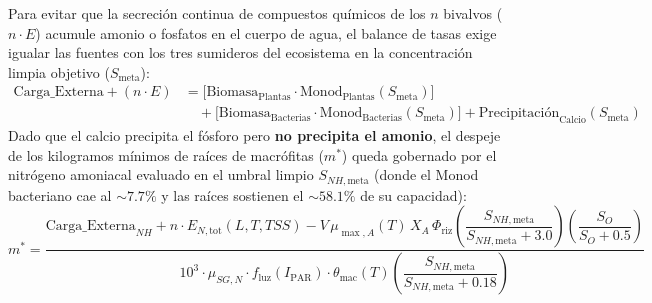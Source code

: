 \documentclass[11pt,letterpaper]{article}
\begin{document}
\begin{resumenbox}
Para evitar que la secreción continua de compuestos químicos de los $n$ bivalvos ($n \cdot E$) acumule amonio o fosfatos en el cuerpo de agua, el balance de tasas exige igualar las fuentes con los tres sumideros del ecosistema en la concentración limpia objetivo ($S_{\text{meta}}$):
\[
\begin{aligned}
    \text{Carga\_Externa} + (n \cdot E) &= \Big[\text{Biomasa}_{\text{Plantas}}\cdot \text{Monod}_{\text{Plantas}}(S_{\text{meta}})\Big] \\
    &\quad + \Big[\text{Biomasa}_{\text{Bacterias}}\cdot \text{Monod}_{\text{Bacterias}}(S_{\text{meta}})\Big] + \text{Precipitación}_{\text{Calcio}}(S_{\text{meta}})
\end{aligned}
\]
Dado que el calcio precipita el fósforo pero \textbf{no precipita el amonio}, el despeje de los kilogramos mínimos de raíces de macrófitas ($m^*$) queda gobernado por el nitrógeno amoniacal evaluado en el umbral limpio $S_{NH,\text{meta}}$ (donde el Monod bacteriano cae al $\sim 7.7\%$ y las raíces sostienen el $\sim 58.1\%$ de su capacidad):
\[
    m^* = \frac{\text{Carga\_Externa}_{NH} + n \cdot E_{N,\text{tot}}(L, T, TSS) - V \, \mu_{\max,A}(T)\,X_A\,\Phi_{\text{riz}}\!\left(\dfrac{S_{NH,\text{meta}}}{S_{NH,\text{meta}} + 3.0}\right)\!\left(\dfrac{S_O}{S_O + 0.5}\right)}{10^3 \cdot \mu_{SG,N}\cdot f_{\text{luz}}(I_{\text{PAR}})\cdot \theta_{\text{mac}}(T)\!\left(\dfrac{S_{NH,\text{meta}}}{S_{NH,\text{meta}} + 0.18}\right)}
\]
\end{resumenbox}
\end{document}
